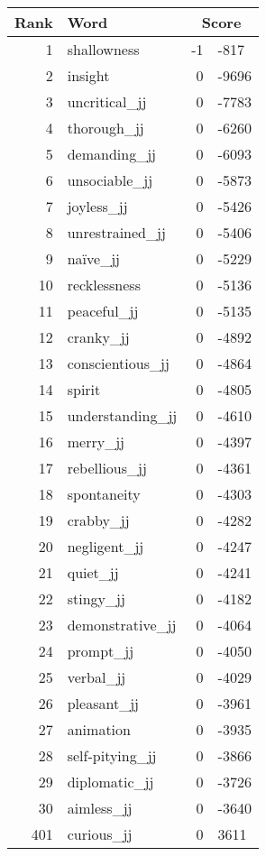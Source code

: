 \begin{longtable}[!htbp]{| rlr@{.}l |}
    \hline
    \textbf{Rank} & \textbf{Word} & \multicolumn{2}{c|}{\textbf{Score}} \\
    \hline
    \endhead
    1 & shallowness & -1 & -817 \\
    2 & insight & 0 & -9696 \\
    3 & uncritical\_jj & 0 & -7783 \\
    4 & thorough\_jj & 0 & -6260 \\
    5 & demanding\_jj & 0 & -6093 \\
    6 & unsociable\_jj & 0 & -5873 \\
    7 & joyless\_jj & 0 & -5426 \\
    8 & unrestrained\_jj & 0 & -5406 \\
    9 & naïve\_jj & 0 & -5229 \\
    10 & recklessness & 0 & -5136 \\
    11 & peaceful\_jj & 0 & -5135 \\
    12 & cranky\_jj & 0 & -4892 \\
    13 & conscientious\_jj & 0 & -4864 \\
    14 & spirit & 0 & -4805 \\
    15 & understanding\_jj & 0 & -4610 \\
    16 & merry\_jj & 0 & -4397 \\
    17 & rebellious\_jj & 0 & -4361 \\
    18 & spontaneity & 0 & -4303 \\
    19 & crabby\_jj & 0 & -4282 \\
    20 & negligent\_jj & 0 & -4247 \\
    21 & quiet\_jj & 0 & -4241 \\
    22 & stingy\_jj & 0 & -4182 \\
    23 & demonstrative\_jj & 0 & -4064 \\
    24 & prompt\_jj & 0 & -4050 \\
    25 & verbal\_jj & 0 & -4029 \\
    26 & pleasant\_jj & 0 & -3961 \\
    27 & animation & 0 & -3935 \\
    28 & self-pitying\_jj & 0 & -3866 \\
    29 & diplomatic\_jj & 0 & -3726 \\
    30 & aimless\_jj & 0 & -3640 \\
    401 & curious\_jj & 0 & 3611 \\

\end{longtable}
